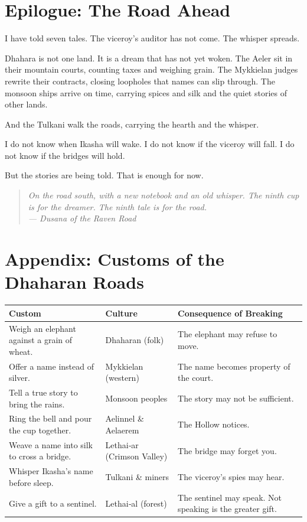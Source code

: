 \documentclass[10pt,twoside]{book}
\newcommand{\dusana}[1]{\begin{quote}\itshape #1 \\ --- Dusana of the Raven Road\end{quote}}
\begin{document}
\chapter*{Epilogue: The Road Ahead}

I have told seven tales. The viceroy's auditor has not come. The whisper spreads.

Dhahara is not one land. It is a dream that has not yet woken. The Aeler sit in their mountain courts, counting taxes and weighing grain. The Mykkielan judges rewrite their contracts, closing loopholes that names can slip through. The monsoon ships arrive on time, carrying spices and silk and the quiet stories of other lands.

And the Tulkani walk the roads, carrying the hearth and the whisper.

I do not know when Ikasha will wake. I do not know if the viceroy will fall. I do not know if the bridges will hold.

But the stories are being told. That is enough for now.

\dusana{On the road south, with a new notebook and an old whisper. The ninth cup is for the dreamer. The ninth tale is for the road.}

\chapter*{Appendix: Customs of the Dhaharan Roads}

\begin{table}[h]
\centering
\begin{tabularx}{\textwidth}{p{4cm} p{4cm} X}
\toprule
\textbf{Custom} & \textbf{Culture} & \textbf{Consequence of Breaking} \\
\midrule
Weigh an elephant against a grain of wheat. & Dhaharan (folk) & The elephant may refuse to move. \\
Offer a name instead of silver. & Mykkielan (western) & The name becomes property of the court. \\
Tell a true story to bring the rains. & Monsoon peoples & The story may not be sufficient. \\
Ring the bell and pour the cup together. & Aelinnel \& Aelaerem & The Hollow notices. \\
Weave a name into silk to cross a bridge. & Lethai‑ar (Crimson Valley) & The bridge may forget you. \\
Whisper Ikasha's name before sleep. & Tulkani \& miners & The viceroy's spies may hear. \\
Give a gift to a sentinel. & Lethai‑al (forest) & The sentinel may speak. Not speaking is the greater gift. \\
\bottomrule
\end{tabularx}
\end{table}
\end{document}
